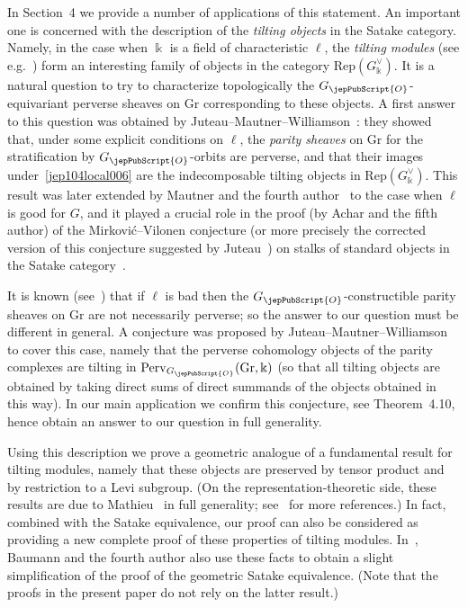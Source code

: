 In Section~4 we provide a number of applications of this statement. An important one is concerned with the description of the \emph{tilting objects} in the Satake category. Namely, in the case when $\Bbbk$ is a field of characteristic $\ell$, the \emph{tilting modules} (see e.g.~\cite[Chap.~E]{jep104ref29}) form an interesting family of objects in the category $\mathrm{Rep}(G^\vee_\Bbbk)$. It is a natural question to try to characterize topologically the $G_{\jepPubScript{O}}$-equivariant perverse sheaves on $\mathrm{Gr}$ corresponding to these objects. A first answer to this question was obtained by Juteau--Mautner--Williamson~\cite{jep104ref32}: they showed that, under some explicit conditions on $\ell$, the \emph{parity sheaves} on $\mathrm{Gr}$ for the stratification by $G_{\jepPubScript{O}}$-orbits are perverse, and that their images under~\eqref{jep104local006} are the indecomposable tilting objects in $\mathrm{Rep}(G^\vee_\Bbbk)$. This result was later extended by Mautner and the fourth author~\cite{jep104ref35} to the case when $\ell$ is good for $G$, and it played a crucial role in the proof (by Achar and the fifth author) of the Mirkovi\'c--Vilonen conjecture (or more precisely the corrected version of this conjecture suggested by Juteau~\cite{jep104ref30}) on stalks of standard objects in the Satake category~\cite{jep104ref06}.

It is known (see~\cite{jep104ref32}) that if $\ell$ is bad then the $G_{\jepPubScript{O}}$-constructible parity sheaves on $\mathrm{Gr}$ are not necessarily perverse; so the answer to our question must be different in general. A conjecture was proposed by Juteau--Mautner--Williamson to cover this case, namely that the perverse cohomology objects of the parity complexes are tilting in $\mathrm{Perv}_{G_{\jepPubScript{O}}}(\mathrm{Gr},\Bbbk)$ (so that all tilting objects are obtained by taking direct sums of direct summands of the objects obtained in this way). In our main application we confirm this conjecture, see Theorem~4.10, hence obtain an answer to our question in full generality.

Using this description we prove a geometric analogue of a fundamental result for tilting modules, namely that these objects are preserved by tensor product and by restriction to a Levi subgroup. (On the representation-theoretic side, these results are due to Mathieu~\cite{jep104ref34} in full generality; see~\cite[\S 1.1]{jep104ref32} for more references.) In fact, combined with the Satake equivalence, our proof can also be considered as providing a new complete proof of these properties of tilting modules. In~\cite{jep104ref11}, Baumann and the fourth author also use these facts to obtain a slight simplification of the proof of the geometric Satake equivalence. (Note that the proofs in the present paper do not rely on the latter result.)

